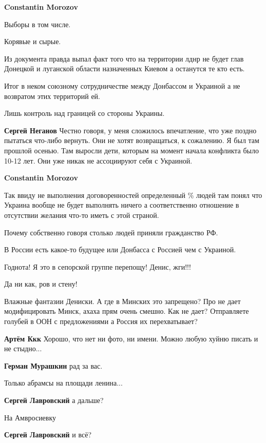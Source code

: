 \begin{itemize}
\begin{itemize}
\textbf{Constantin Morozov} 

Выборы в том числе.

Корявые и сырые.

Из документа правда выпал факт того что на территории лднр не будет глав
Донецкой и луганской области назначенных Киевом а останутся те кто есть.

Итог в неком союзному сотрудничестве между Донбассом и Украиной а не возвратом
этих территорий ей.

Лишь контроль над границей со стороны Украины.

\textbf{Сергей Неганов} Честно говоря, у меня сложилось впечатление, что уже поздно пытаться что-либо вернуть. Они не хотят возвращаться, к сожалению. Я был там прошлой осенью. Там выросли дети, которым на момент начала конфликта было 10-12 лет. Они уже никак не ассоциируют себя с Украиной.

\textbf{Constantin Morozov} 

Так ввиду не выполнения договоренностей определенный \% людей там понял что
Украина вообще не будет выполнять ничего а соответственно отношение в
отсутствии желания что-то иметь с этой страной.

Почему собственно говоря столько людей приняли гражданство РФ.

В России есть какое-то будущее или Донбасса с Россией чем с Украиной.

\end{itemize} %

Годнота! Я это в сепорской группе перепощу! Денис, жги!!!

Да ни как, ров и стену!


Влажные фантазии Дениски. А где в Минских это запрещено? Про не дает
модифицировать Минск, ахаха прям очень смешно. Как не дает? Отправляете голубей
в ООН с предложениями а Россия их перехватывает?

\begin{itemize} %
\textbf{Артём Ккк} Хорошо, что нет ни фото, ни имени. Можно любую хуйню писать и не стыдно...

\textbf{Герман Мурашкин} рад за вас.
\end{itemize} %

Только абрамсы на площади ленина...

\begin{itemize} %
\textbf{Сергей Лавровский} а дальше?

На Амвросиевку

\textbf{Сергей Лавровский} и всё?
\end{itemize} %

\end{itemize} %
